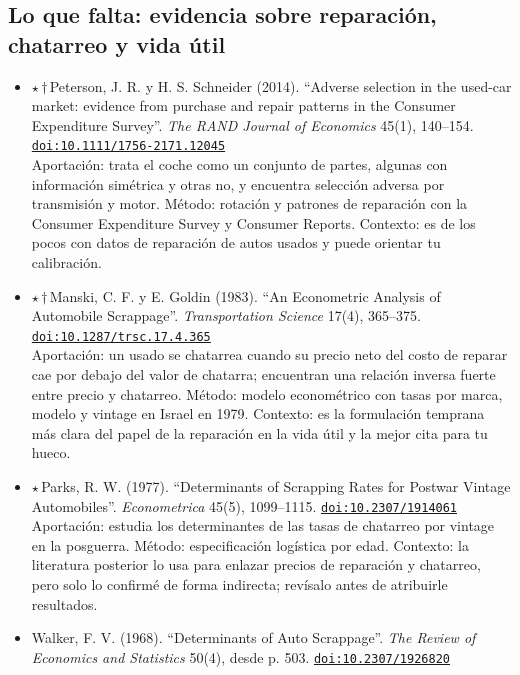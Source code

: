 \documentclass[11pt]{article}
\begin{document}
\subsection*{Lo que falta: evidencia sobre reparación, chatarreo y vida útil}
\begin{itemize}
\item $\star$\,$\dagger$\,Peterson, J. R. y H. S. Schneider (2014). ``Adverse selection in the used-car market: evidence from purchase and repair patterns in the Consumer Expenditure Survey''. \textit{The RAND Journal of Economics} 45(1), 140--154. \href{https://doi.org/10.1111/1756-2171.12045}{\texttt{doi:10.1111/1756-2171.12045}}\\
Aportación: trata el coche como un conjunto de partes, algunas con información simétrica y otras no, y encuentra selección adversa por transmisión y motor. Método: rotación y patrones de reparación con la Consumer Expenditure Survey y Consumer Reports. Contexto: es de los pocos con datos de reparación de autos usados y puede orientar tu calibración.
\item $\star$\,$\dagger$\,Manski, C. F. y E. Goldin (1983). ``An Econometric Analysis of Automobile Scrappage''. \textit{Transportation Science} 17(4), 365--375. \href{https://doi.org/10.1287/trsc.17.4.365}{\texttt{doi:10.1287/trsc.17.4.365}}\\
Aportación: un usado se chatarrea cuando su precio neto del costo de reparar cae por debajo del valor de chatarra; encuentran una relación inversa fuerte entre precio y chatarreo. Método: modelo econométrico con tasas por marca, modelo y vintage en Israel en 1979. Contexto: es la formulación temprana más clara del papel de la reparación en la vida útil y la mejor cita para tu hueco.
\item $\star$\,Parks, R. W. (1977). ``Determinants of Scrapping Rates for Postwar Vintage Automobiles''. \textit{Econometrica} 45(5), 1099--1115. \href{https://doi.org/10.2307/1914061}{\texttt{doi:10.2307/1914061}}\\
Aportación: estudia los determinantes de las tasas de chatarreo por vintage en la posguerra. Método: especificación logística por edad. Contexto: la literatura posterior lo usa para enlazar precios de reparación y chatarreo, pero solo lo confirmé de forma indirecta; revísalo antes de atribuirle resultados.
\item Walker, F. V. (1968). ``Determinants of Auto Scrappage''. \textit{The Review of Economics and Statistics} 50(4), desde p. 503. \href{https://doi.org/10.2307/1926820}{\texttt{doi:10.2307/1926820}}\\

\end{itemize}
\end{document}
